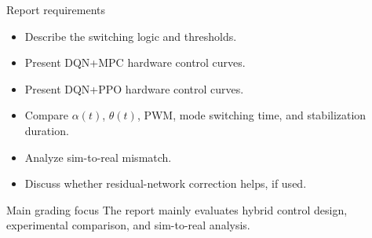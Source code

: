 \documentclass[aspectratio=169]{beamer}
\begin{document}
\begin{frame}{Report requirements}

\begin{itemize}
    \item Describe the switching logic and thresholds.
    \vspace{0.15cm}
    \item Present DQN+MPC hardware control curves.
    \vspace{0.15cm}
    \item Present DQN+PPO hardware control curves.
    \vspace{0.15cm}
    \vspace{0.15cm}
    \item Compare \(\alpha(t)\), \(\theta(t)\), PWM, mode switching time, and stabilization duration.
    \vspace{0.15cm}
    \item Analyze sim-to-real mismatch.
    \vspace{0.15cm}
    \item Discuss whether residual-network correction helps, if used.
\end{itemize}

\vspace{0.15cm}

\begin{block}{Main grading focus}
\small
The report mainly evaluates hybrid control design, experimental comparison, and sim-to-real analysis.
\end{block}

\end{frame}

\end{document}
